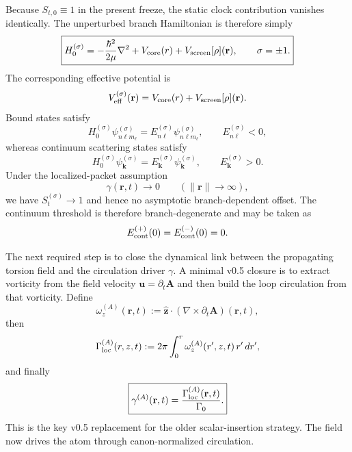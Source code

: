\documentclass[11pt,a4paper]{article}
\begin{document}
Because $S_{t,0}\equiv 1$ in the present freeze, the static clock contribution vanishes identically. The unperturbed branch Hamiltonian is therefore simply
\begin{equation}
\label{eq:H0sigma}
\boxed{
H_0^{(\sigma)}
=
-\frac{\hbar^2}{2\mu}\nabla^2
+
V_{\rm core}(r)
+
V_{\rm screen}[\rho](\mathbf r),
\qquad
\sigma=\pm 1.
}
\end{equation}
The corresponding effective potential is
\begin{equation}
\label{eq:Veffsigma}
V_{\rm eff}^{(\sigma)}(\mathbf r)
=
V_{\rm core}(r)
+
V_{\rm screen}[\rho](\mathbf r).
\end{equation}
Bound states satisfy
\begin{equation}
\label{eq:boundstates}
H_0^{(\sigma)}\psi_{n\ell m_\ell}^{(\sigma)}
=
E_{n\ell}^{(\sigma)}\psi_{n\ell m_\ell}^{(\sigma)},
\qquad
E_{n\ell}^{(\sigma)}<0,
\end{equation}
whereas continuum scattering states satisfy
\begin{equation}
\label{eq:continuumstates}
H_0^{(\sigma)}\psi_{\mathbf k}^{(\sigma)}
=
E_{\mathbf k}^{(\sigma)}\psi_{\mathbf k}^{(\sigma)},
\qquad
E_{\mathbf k}^{(\sigma)}>0.
\end{equation}
Under the localized-packet assumption
\begin{equation}
\label{eq:gammaAsymptotic}
\gamma(\mathbf r,t)\to 0 \qquad (\lVert \mathbf r\rVert\to\infty),
\end{equation}
we have $S_t^{(\sigma)}\to 1$ and hence no asymptotic branch-dependent offset. The continuum threshold is therefore branch-degenerate and may be taken as
\begin{equation}
\label{eq:continuum-threshold}
E_{\rm cont}^{(+)}(0)=E_{\rm cont}^{(-)}(0)=0.
\end{equation}

The next required step is to close the dynamical link between the propagating torsion field and the circulation driver $\gamma$. A minimal v0.5 closure is to extract vorticity from the field velocity $\mathbf u=\partial_t\mathbf A$ and then build the loop circulation from that vorticity. Define
\begin{equation}
\label{eq:omegaA}
\omega_z^{(A)}(\mathbf r,t)
:=
\hat{\mathbf z}\cdot\left(\nabla\times \partial_t \mathbf A\right)(\mathbf r,t),
\end{equation}
then
\begin{equation}
\label{eq:GammaA}
\Gamma_{\rm loc}^{(A)}(r,z,t)
:=
2\pi\int_0^r \omega_z^{(A)}(r',z,t)\,r'\,dr',
\end{equation}
and finally
\begin{equation}
\label{eq:gammaA}
\boxed{
\gamma^{(A)}(\mathbf r,t)
=
\frac{\Gamma_{\rm loc}^{(A)}(\mathbf r,t)}{\Gamma_0}.
}
\end{equation}
This is the key v0.5 replacement for the older scalar-insertion strategy. The field now drives the atom through canon-normalized circulation.
\end{document}
